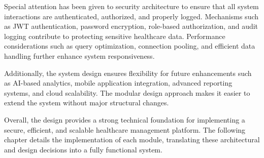 \justifying
\noindent Special attention has been given to security architecture to ensure that all system interactions are authenticated, authorized, and properly logged. Mechanisms such as JWT authentication, password encryption, role-based authorization, and audit logging contribute to protecting sensitive healthcare data. Performance considerations such as query optimization, connection pooling, and efficient data handling further enhance system responsiveness.

\justifying
\noindent Additionally, the system design ensures flexibility for future enhancements such as AI-based analytics, mobile application integration, advanced reporting systems, and cloud scalability. The modular design approach makes it easier to extend the system without major structural changes.

\justifying
\noindent Overall, the design provides a strong technical foundation for implementing a secure, efficient, and scalable healthcare management platform. The following chapter details the implementation of each module, translating these architectural and design decisions into a fully functional system.